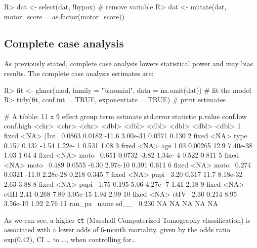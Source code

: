 \documentclass[
]{jss}
\begin{document}
\begin{CodeChunk}
\begin{CodeInput}
R> dat <- select(dat, !hypox)  # remove variable
R> dat <- mutate(dat, motor_score = as.factor(motor_score))
\end{CodeInput}
\end{CodeChunk}

\hypertarget{complete-case-analysis}{%
\subsection{Complete case analysis}\label{complete-case-analysis}}

As previously stated, complete case analysis lowers statistical power
and may bias results. The complete case analysis estimates are:

\begin{CodeChunk}
\begin{CodeInput}
R> fit <- glmer(mod, family = "binomial", data = na.omit(dat)) # fit the model
R> tidy(fit, conf.int = TRUE, exponentiate = TRUE)             # print estimates
\end{CodeInput}
\begin{CodeOutput}
# A tibble: 11 x 9
   effect  group term  estimate std.error statistic   p.value conf.low conf.high
   <chr>   <chr> <chr>    <dbl>     <dbl>     <dbl>     <dbl>    <dbl>     <dbl>
 1 fixed   <NA>  (Int~   0.0863   0.0182     -11.6   3.00e-31   0.0571     0.130
 2 fixed   <NA>  type~   0.757    0.137       -1.54  1.22e- 1   0.531      1.08 
 3 fixed   <NA>  age     1.03     0.00265     12.9   7.40e-38   1.03       1.04 
 4 fixed   <NA>  moto~   0.651    0.0732      -3.82  1.34e- 4   0.522      0.811
 5 fixed   <NA>  moto~   0.489    0.0555      -6.30  2.97e-10   0.391      0.611
 6 fixed   <NA>  moto~   0.274    0.0321     -11.0   2.28e-28   0.218      0.345
 7 fixed   <NA>  pupi~   3.20     0.317       11.7   8.18e-32   2.63       3.88 
 8 fixed   <NA>  pupi~   1.75     0.195        5.06  4.27e- 7   1.41       2.18 
 9 fixed   <NA>  ctIII   2.41     0.268        7.89  3.05e-15   1.94       2.99 
10 fixed   <NA>  ctIV~   2.30     0.214        8.95  3.56e-19   1.92       2.76 
11 ran_pa~ name  sd__~   0.230   NA           NA    NA         NA         NA    
\end{CodeOutput}
\end{CodeChunk}

As we can see, a higher \texttt{ct} (Marshall Computerized Tomography
classification) is associated with a lower odds of 6-month mortality,
given by the odds ratio exp(0.42), CI \ldots{} to \ldots, when
controlling for\ldots{}
\end{document}
